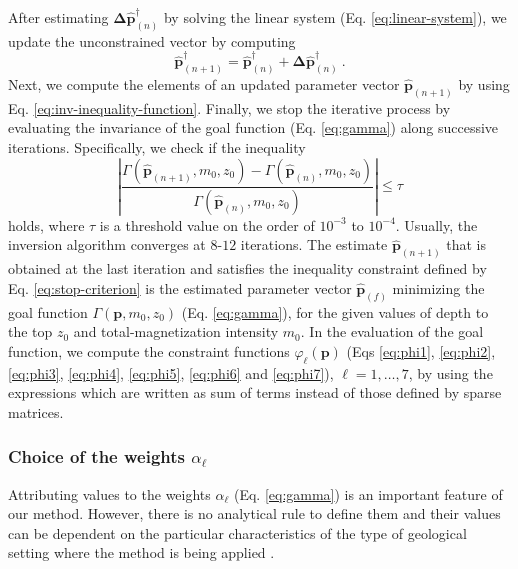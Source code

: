 After estimating $\boldsymbol{\Delta} \hat{\mathbf{p}}^{\dagger}_{(n)}$ by 
solving the linear system (Eq. \ref{eq:linear-system}), we update the unconstrained 
vector by computing
\begin{equation}\label{eq:p-k1-dagger}
\hat{\mathbf{p}}^{\dagger}_{(n + 1)} =
\hat{\mathbf{p}}^{\dagger}_{(n)} +
\boldsymbol{\Delta} \hat{\mathbf{p}}^{\dagger}_{(n)} \: .
\end{equation}
Next, we compute the elements of an updated parameter vector $\hat{\mathbf{p}}_{(n + 1)}$ by using Eq. \ref{eq:inv-inequality-function}.
Finally, we stop the iterative process by evaluating the invariance of the 
goal function (Eq. \ref{eq:gamma}) along successive iterations.
Specifically, we check if the inequality
\begin{equation}\label{eq:stop-criterion}
 \left| \frac{\Gamma (\hat{\mathbf{p}}_{(n +1)}, m_{0}, z_{0}) - 
 \Gamma (\hat{\mathbf{p}}_{(n)}, m_{0}, z_{0})}
 {\Gamma (\hat{\mathbf{p}}_{(n)}, m_{0}, z_{0})} 
 \right| \le \tau
\end{equation}
holds, where $\tau$ is a threshold value on the order of $10^{-3}$ to $10^{-4}$. 
Usually, the inversion algorithm converges at $8$-$12$ iterations.
The estimate $\hat{\mathbf{p}}_{(n+1)}$ that is obtained
at the last iteration and satisfies the inequality constraint defined by
Eq. \ref{eq:stop-criterion} is the estimated parameter vector
$\hat{\mathbf{p}}_{(f)}$ minimizing the goal function
$\Gamma (\mathbf{p}, m_{0}, z_{0})$ (Eq. \ref{eq:gamma}), for the given
values of depth to the top $z_{0}$ and total-magnetization intensity $m_{0}$.
In the evaluation of the goal function, we compute the 
constraint functions $\varphi_{\ell}(\mathbf{p})$ (Eqs \ref{eq:phi1}, \ref{eq:phi2},
\ref{eq:phi3}, \ref{eq:phi4}, \ref{eq:phi5}, \ref{eq:phi6} and \ref{eq:phi7}), 
$\ell = 1, \dots, 7$, by using the expressions which are written as sum of 
terms instead of those defined by sparse matrices.


\subsubsection{Choice of the weights $\alpha_{\ell}$}

Attributing values to the weights $ \alpha_{\ell} $ (Eq. \ref{eq:gamma}) is an important feature of our method. 
However, there is no analytical rule to define them and their values can be dependent on the particular characteristics of the type of geological setting where the method is being applied \cite[]{silva-2001}. 

